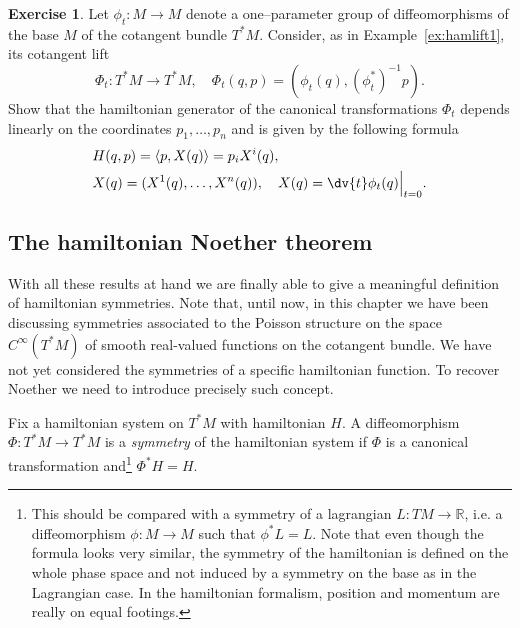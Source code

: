 \documentclass[english,fontsize=11pt,paper=b5]{scrbook}
\numberwithin{equation}{chapter}
\theoremstyle{definition}
\newtheorem{exercise}{Exercise}[chapter]
\begin{document}
    \begin{exercise}
      Let $\phi_t:M\to M$ denote a one--parameter group of diffeomorphisms of the base  $M$ of the cotangent bundle $T^*M$.
      Consider, as in Example~\ref{ex:hamlift1}, its cotangent lift
      \begin{equation}
        \Phi_t:T^*M\to T^*M, \quad \Phi_t(q,p) = \left(\phi_t(q), \left(\phi_t^*\right)^{-1}p\right).
      \end{equation}
      Show that the hamiltonian generator of the canonical transformations $\Phi_t$ depends linearly on the coordinates $p_1, \ldots, p_n$ and is given by the following formula
      \begin{align}
     & H(q,p) = \langle p, X(q) \rangle = p_i X^i(q), \label{eq:linhamp}                   \\
     & X(q) = (X^1(q), \ldots, X^n(q)), \quad X(q) = \dv{t} \phi_t(q)\Big|_{t=0}.
      \end{align}
    \end{exercise}

    \subsection{The hamiltonian Noether theorem}

    With all these results at hand we are finally able to give a meaningful definition of hamiltonian symmetries.
    Note that, until now, in this chapter we have been discussing symmetries associated to the Poisson structure on the space $C^\infty(T^*M)$ of smooth real-valued functions on the cotangent bundle.
    We have not yet considered the symmetries of a specific hamiltonian function.
    To recover Noether we need to introduce precisely such concept.

    \begin{tcolorbox}
      Fix a hamiltonian system on $T^*M$ with hamiltonian $H$. A diffeomorphism $\Phi:T^*M\to T^* M$ is a \emph{symmetry} of the hamiltonian system if $\Phi$ is a canonical transformation and\footnote{This should be compared with a symmetry of a lagrangian $L:TM \to\mathbb{R}$, i.e. a diffeomorphism $\phi: M \to M$ such that $\phi^* L = L$. Note that even though the formula looks very similar, the symmetry of the hamiltonian is defined on the whole phase space and not induced by a symmetry on the base as in the Lagrangian case. In the hamiltonian formalism, position and momentum are really on equal footings.} $\Phi^* H = H$.
    \end{tcolorbox}
\end{document}
